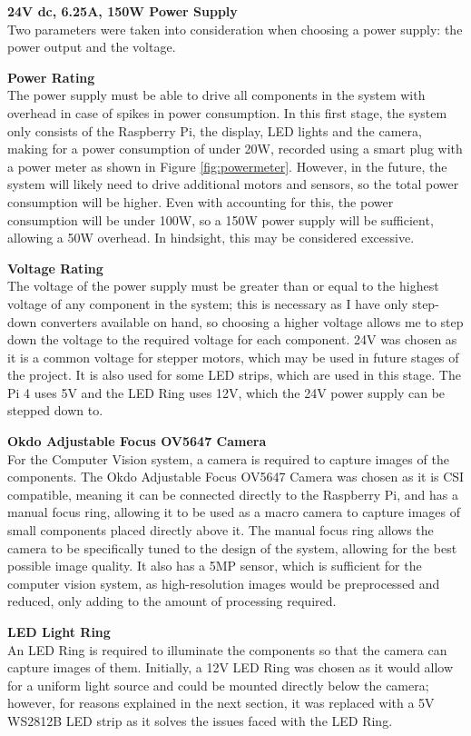 \vspace{1em}
\noindent
\textbf{24V dc, 6.25A, 150W Power Supply} \\
Two parameters were taken into consideration when choosing a power supply: the power output and the voltage.
\begin{mylist}
  \item \textbf{Power Rating} \\
  The power supply must be able to drive all components in the system with overhead in case of spikes in power consumption.
  In this first stage, the system only consists of the Raspberry Pi, the display, LED lights and the camera, 
  making for a power consumption of under 20W, recorded using a smart plug with a power meter as shown in Figure \ref*{fig:powermeter}.
  However, in the future, the system will likely need to drive additional motors and sensors, so the total power consumption
  will be higher. Even with accounting for this, the power consumption will be under 100W, so a 150W power supply will be sufficient,
  allowing a 50W overhead. In hindsight, this may be considered excessive.
  \item \textbf{Voltage Rating} \\
  The voltage of the power supply must be greater than or equal to the highest voltage of any component in the system; this is necessary
  as I have only step-down converters available on hand, so choosing a higher voltage allows me to step down the voltage 
  to the required voltage for each component. 24V was chosen as it is a common voltage for stepper motors, which may be used in
  future stages of the project. It is also used for some LED strips, which are used in this stage. The Pi 4 uses 5V and the LED Ring
  uses 12V, which the 24V power supply can be stepped down to.
\end{mylist}

\noindent
\textbf{Okdo Adjustable Focus OV5647 Camera} \\
For the Computer Vision system, a camera is required to capture images of the components. The Okdo Adjustable Focus OV5647 Camera
was chosen as it is CSI compatible, meaning it can be connected directly to the Raspberry Pi, and has a manual focus ring, allowing
it to be used as a macro camera to capture images of small components placed directly above it. The manual focus ring allows the camera
to be specifically tuned to the design of the system, allowing for the best possible image quality. It also
has a 5MP sensor\cite{okdospec}, which is sufficient for the computer vision system, as high-resolution images would be preprocessed and reduced,
only adding to the amount of processing required.

\vspace{1em}
\noindent
\textbf{LED Light Ring} \\
An LED Ring is required to illuminate the components so that the camera can capture images of them.
Initially, a 12V LED Ring was chosen as it would allow for a uniform light source and could be mounted directly below the camera; 
however, for reasons explained in the next section, it was replaced with a 5V WS2812B LED strip as it solves the issues
faced with the LED Ring.
